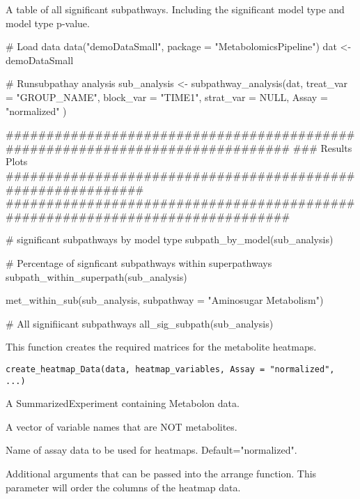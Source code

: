 \documentclass[a4paper]{book}
\begin{document}
%
\begin{Value}
A table of all significant subpathways. Including the significant
model type
and model type p-value.
\end{Value}
%
\begin{Examples}
\begin{ExampleCode}
# Load data
data("demoDataSmall", package = "MetabolomicsPipeline")
dat <- demoDataSmall

# Runsubpathay analysis
sub_analysis <- subpathway_analysis(dat,
    treat_var = "GROUP_NAME",
    block_var = "TIME1",
    strat_var = NULL,
    Assay = "normalized"
)

##############################################################################
### Results Plots ############################################################
##############################################################################

# significant subpathways by model type
subpath_by_model(sub_analysis)

# Percentage of signficant subpathways within superpathways
subpath_within_superpath(sub_analysis)

met_within_sub(sub_analysis, subpathway = "Aminosugar Metabolism")

# All signifiicant subpathways
all_sig_subpath(sub_analysis)

\end{ExampleCode}
\end{Examples}
%
\begin{Description}
This function creates the required matrices for the metabolite heatmaps.
\end{Description}
%
\begin{Usage}
\begin{verbatim}
create_heatmap_Data(data, heatmap_variables, Assay = "normalized", ...)
\end{verbatim}
\end{Usage}
%
\begin{Arguments}
\begin{ldescription}
\item[\code{data}] A SummarizedExperiment containing Metabolon data.

\item[\code{heatmap\_variables}] A vector of variable names that are NOT metabolites.

\item[\code{Assay}] Name of assay data to be used for heatmaps.
Default="normalized".

\item[\code{...}] Additional arguments that can be passed into the arrange function.
This parameter will order the columns of the heatmap data.
\end{ldescription}
\end{Arguments}
\end{document}
